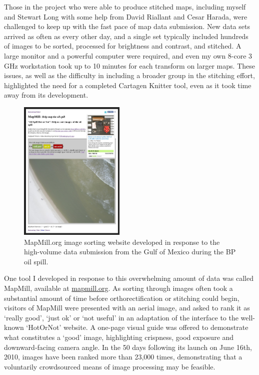 \documentclass[11pt,oneside,notitlepage]{report}
\begin{document}
Those in the project who were able to produce stitched maps, including myself and Stewart Long with some help from David Riallant and Cesar Harada, were challenged to keep up with the fast pace of map data submission. New data sets arrived as often as every other day, and a single set typically included hundreds of images to be sorted, processed for brightness and contrast, and stitched. A large monitor and a powerful computer were required, and even my own 8-core 3 GHz workstation took up to 10 minutes for each transform on larger maps. These issues, as well as the difficulty in including a broader group in the stitching effort, highlighted the need for a completed Cartagen Knitter tool, even as it took time away from its development. 

\begin{figure}
	\begin{flushright}
		\includegraphics[width=0.45\textwidth]{images/mapmill.png}
		\caption{MapMill.org image sorting website developed in response to the high-volume data submission from the Gulf of Mexico during the BP oil spill.}
	\end{flushright}
\end{figure}

One tool I developed in response to this overwhelming amount of data was called MapMill, available at \href{http://mapmill.org}{mapmill.org}. As sorting through images often took a substantial amount of time before orthorectification or stitching could begin, visitors of MapMill were presented with an aerial image, and asked to rank it as `really good', `just ok' or `not useful' in an adaptation of the interface to the well-known `HotOrNot' website. A one-page visual guide was offered to demonstrate what constitutes a `good' image, highlighting crispness, good exposure and downward-facing camera angle. In the 50 days following its launch on June 16th, 2010, images have been ranked more than 23,000 times, demonstrating that a voluntarily crowdsourced means of image processing may be feasible. 
\end{document}
